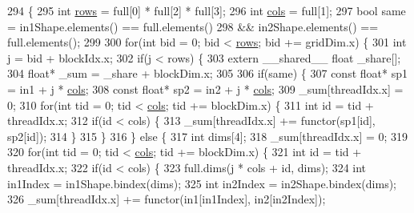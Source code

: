 \begin{DoxyCode}
294                                            \{
295   \textcolor{keywordtype}{int} \hyperlink{namespacemarian_ace1e9a63d52edc363d70d661cf8d0257}{rows} = full[0] * full[2] * full[3];
296   \textcolor{keywordtype}{int} \hyperlink{namespacemarian_ab9fbdcc76cc853270094524572584222}{cols} = full[1];
297   \textcolor{keywordtype}{bool} same = in1Shape.elements() == full.elements()
298               && in2Shape.elements() == full.elements();
299 
300   \textcolor{keywordflow}{for}(\textcolor{keywordtype}{int} bid = 0; bid < \hyperlink{namespacemarian_ace1e9a63d52edc363d70d661cf8d0257}{rows}; bid += gridDim.x) \{
301     \textcolor{keywordtype}{int} j = bid + blockIdx.x;
302     \textcolor{keywordflow}{if}(j < rows) \{
303       \textcolor{keyword}{extern} \_\_shared\_\_ \textcolor{keywordtype}{float} \_share[];
304       \textcolor{keywordtype}{float}* \_sum = \_share + blockDim.x;
305 
306       \textcolor{keywordflow}{if}(same) \{
307         \textcolor{keyword}{const} \textcolor{keywordtype}{float}* sp1 = in1 + j * \hyperlink{namespacemarian_ab9fbdcc76cc853270094524572584222}{cols};
308         \textcolor{keyword}{const} \textcolor{keywordtype}{float}* sp2 = in2 + j * \hyperlink{namespacemarian_ab9fbdcc76cc853270094524572584222}{cols};
309         \_sum[threadIdx.x] = 0;
310         \textcolor{keywordflow}{for}(\textcolor{keywordtype}{int} tid = 0; tid < \hyperlink{namespacemarian_ab9fbdcc76cc853270094524572584222}{cols}; tid += blockDim.x) \{
311           \textcolor{keywordtype}{int} \textcolor{keywordtype}{id} = tid + threadIdx.x;
312           \textcolor{keywordflow}{if}(\textcolor{keywordtype}{id} < cols) \{
313             \_sum[threadIdx.x] += functor(sp1[\textcolor{keywordtype}{id}], sp2[\textcolor{keywordtype}{id}]);
314           \}
315         \}
316       \} \textcolor{keywordflow}{else} \{
317         \textcolor{keywordtype}{int} dims[4];
318         \_sum[threadIdx.x] = 0;
319 
320         \textcolor{keywordflow}{for}(\textcolor{keywordtype}{int} tid = 0; tid < \hyperlink{namespacemarian_ab9fbdcc76cc853270094524572584222}{cols}; tid += blockDim.x) \{
321           \textcolor{keywordtype}{int} \textcolor{keywordtype}{id} = tid + threadIdx.x;
322           \textcolor{keywordflow}{if}(\textcolor{keywordtype}{id} < cols) \{
323             full.dims(j * cols + \textcolor{keywordtype}{id}, dims);
324             \textcolor{keywordtype}{int} in1Index = in1Shape.bindex(dims);
325             \textcolor{keywordtype}{int} in2Index = in2Shape.bindex(dims);
326             \_sum[threadIdx.x] += functor(in1[in1Index], in2[in2Index]);

\end{DoxyCode}

